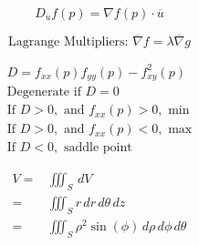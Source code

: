 \documentclass[12pt]{article}
\begin{document}
\vspace{-30pt}

\begin{multicols}{2}

  \begin{equation*}
    D_{\overline{u}}f(p)=\nabla f(p)\cdot\overline{u}
  \end{equation*}
    
  \begin{equation*}
    \text{Lagrange Multipliers: }\overline{\nabla}f=\lambda\overline{\nabla}g
  \end{equation*}

\end{multicols}

\vspace{-30pt}

\begin{multicols}{2}

  \begin{equation*}
    \begin{split}
    D=f_{xx}(p)f_{yy}(p)-f_{xy}^2(p)\\
    \text{Degenerate if } D = 0\\
    \text{If }D > 0,\text{ and }f_{xx}(p) > 0,\text{ min}\\
    \text{If }D > 0,\text{ and }f_{xx}(p) < 0,\text{ max}\\
    \text{If }D < 0,\text{ saddle point}
  \end{split}
  \end{equation*}

  \begin{equation*}
    \begin{split}
    V=&\iiint_S\,dV\\
    =&\iiint_Sr\,dr\,d\theta\,dz\\
    =&\iiint_S\rho^2\sin(\phi)\,d\rho\,d\phi\,d\theta
  \end{split}
  \end{equation*}

\end{multicols}

\vspace{-30pt}
\end{document}
